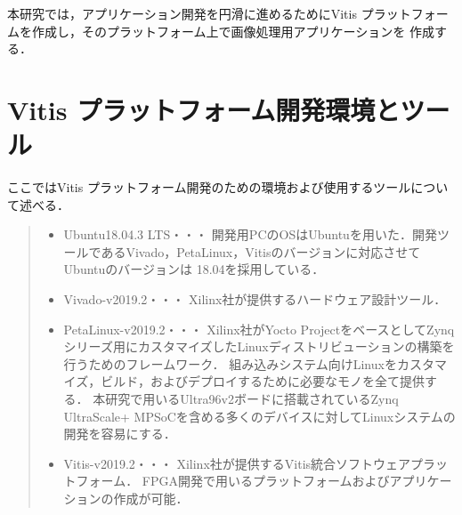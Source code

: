 \documentclass[11pt,a4j]{jreport}
\begin{document}
本研究では，アプリケーション開発を円滑に進めるためにVitis プラットフォームを作成し，そのプラットフォーム上で画像処理用アプリケーションを
作成する．

\section{Vitis プラットフォーム開発環境とツール}
ここではVitis プラットフォーム開発のための環境および使用するツールについて述べる．
\begin{quote}
  \begin{itemize}
    \item Ubuntu18.04.3 LTS・・・
    開発用PCのOSはUbuntuを用いた．開発ツールであるVivado，PetaLinux，Vitisのバージョンに対応させてUbuntuのバージョンは
    18.04を採用している．
    \item Vivado-v2019.2・・・
    Xilinx社が提供するハードウェア設計ツール．
    \item PetaLinux-v2019.2・・・
    Xilinx社がYocto ProjectをベースとしてZynqシリーズ用にカスタマイズしたLinuxディストリビューションの構築を行うためのフレームワーク．
    組み込みシステム向けLinuxをカスタマイズ，ビルド，およびデプロイするために必要なモノを全て提供する．
    本研究で用いるUltra96v2ボードに搭載されているZynq UltraScale+ MPSoCを含める多くのデバイスに対してLinuxシステムの開発を容易にする．
    \item Vitis-v2019.2・・・
    Xilinx社が提供するVitis統合ソフトウェアプラットフォーム．
    FPGA開発で用いるプラットフォームおよびアプリケーションの作成が可能．
  \end{itemize}
\end{quote}
\end{document}
